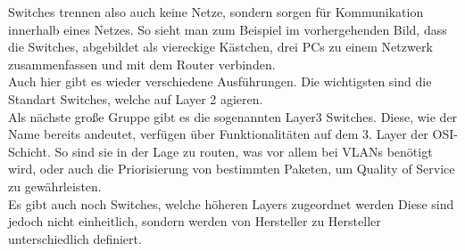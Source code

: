 \documentclass[12pt,a4paper]{report}
\begin{document}
Switches trennen also auch keine Netze, sondern sorgen für Kommunikation innerhalb eines Netzes. So sieht man zum Beispiel im vorhergehenden Bild, dass die Switches, abgebildet als viereckige Kästchen, drei PCs zu einem Netzwerk zusammenfassen und mit dem Router verbinden.\\

Auch hier gibt es wieder verschiedene Ausführungen. Die wichtigsten sind die Standart Switches, welche auf Layer 2 agieren.\\
Als nächste große Gruppe gibt es die sogenannten Layer3 Switches. Diese, wie der Name bereits andeutet, verfügen über Funktionalitäten auf dem 3. Layer der OSI-Schicht. So sind sie in der Lage zu routen, was vor allem bei VLANs benötigt wird, oder auch die Priorisierung von bestimmten Paketen, um Quality of Service zu gewährleisten.\\
Es gibt auch noch Switches, welche höheren Layers zugeordnet werden Diese sind jedoch nicht einheitlich, sondern werden von Hersteller zu Hersteller unterschiedlich definiert.
\end{document}
